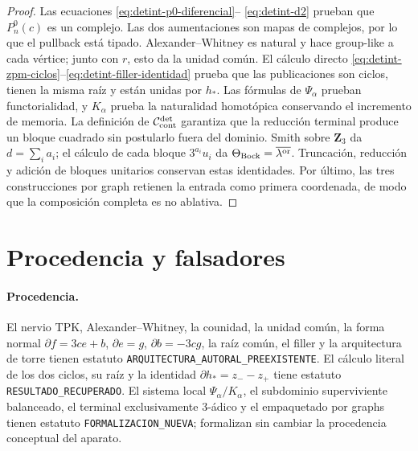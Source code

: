 \begin{proof}
Las ecuaciones \eqref{eq:detint-p0-diferencial}--
\eqref{eq:detint-d2} prueban que \(P_n^0(c)\) es un complejo. Las dos
aumentaciones son mapas de complejos, por lo que el pullback está tipado.
Alexander--Whitney es natural y hace group-like a cada vértice; junto con
\(r\), esto da la unidad común. El cálculo directo
\eqref{eq:detint-zpm-ciclos}--\eqref{eq:detint-filler-identidad} prueba que
las publicaciones son ciclos, tienen la misma raíz y están unidas por
\(h_*\). Las fórmulas de \(\Psi_\alpha\) prueban functorialidad, y
\(K_\alpha\) prueba la naturalidad homotópica conservando el incremento de
memoria. La definición de \(\mathcal C_{\rm cont}^{\rm det}\) garantiza que
la reducción terminal produce un bloque cuadrado sin postularlo fuera del
dominio. Smith sobre \(\mathbf Z_3\) da \(d=\sum_i a_i\); el cálculo de cada
bloque \(3^{a_i}u_i\) da
\(\Theta_{\rm Bock}=\overline{\lambda^{\rm or}}\). Truncación, reducción y
adición de bloques unitarios conservan estas identidades. Por último, las
tres construcciones por graph retienen la entrada como primera coordenada,
de modo que la composición completa es no ablativa.
\end{proof}

\section{Procedencia y falsadores}

\paragraph{Procedencia.}
El nervio TPK, Alexander--Whitney, la counidad, la unidad común, la forma
normal \(\partial f=3ce+b\), \(\partial e=g\),
\(\partial b=-3cg\), la raíz común, el filler y la arquitectura de torre
tienen estatuto \texttt{ARQUITECTURA\_AUTORAL\_PREEXISTENTE}. El cálculo
literal de los dos ciclos, su raíz y la identidad
\(\partial h_*=z_--z_+\) tiene estatuto \texttt{RESULTADO\_RECUPERADO}. El
sistema local \(\Psi_\alpha/K_\alpha\), el subdominio superviviente
balanceado, el terminal exclusivamente \(3\)-ádico y el empaquetado por
graphs tienen estatuto \texttt{FORMALIZACION\_NUEVA}; formalizan sin cambiar
la procedencia conceptual del aparato.

